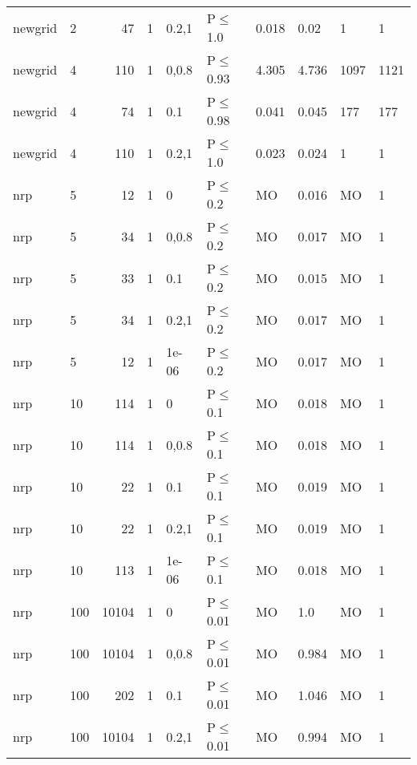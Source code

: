 \begin{longtable}{llrrllllll}
 newgrid       & 2        &     	47 & 1 & 0.2,1 & P$\leq$1.0   & 0.018   & 0.02     & 1      & 1      \\
 newgrid       & 4        &    	110 & 1 & 0,0.8 & P$\leq$0.93  & 4.305   & 4.736    & 1097   & 1121   \\
 newgrid       & 4        &     	74 & 1 & 0.1   & P$\leq$0.98  & 0.041   & 0.045    & 177    & 177    \\
 newgrid       & 4        &    	110 & 1 & 0.2,1 & P$\leq$1.0   & 0.023   & 0.024    & 1      & 1      \\
 nrp           & 5        &     	12 & 1 & 0     & P$\leq$0.2   & MO      & 0.016    & MO     & 1      \\
 nrp           & 5        &     	34 & 1 & 0,0.8 & P$\leq$0.2   & MO      & 0.017    & MO     & 1      \\
 nrp           & 5        &     	33 & 1 & 0.1   & P$\leq$0.2   & MO      & 0.015    & MO     & 1      \\
 nrp           & 5        &     	34 & 1 & 0.2,1 & P$\leq$0.2   & MO      & 0.017    & MO     & 1      \\
 nrp           & 5        &     	12 & 1 & 1e-06 & P$\leq$0.2   & MO      & 0.017    & MO     & 1      \\
 nrp           & 10       &    	114 & 1 & 0     & P$\leq$0.1   & MO      & 0.018    & MO     & 1      \\
 nrp           & 10       &    	114 & 1 & 0,0.8 & P$\leq$0.1   & MO      & 0.018    & MO     & 1      \\
 nrp           & 10       &     	22 & 1 & 0.1   & P$\leq$0.1   & MO      & 0.019    & MO     & 1      \\
 nrp           & 10       &     	22 & 1 & 0.2,1 & P$\leq$0.1   & MO      & 0.019    & MO     & 1      \\
 nrp           & 10       &    	113 & 1 & 1e-06 & P$\leq$0.1   & MO      & 0.018    & MO     & 1      \\
 nrp           & 100      &  	10104 & 1 & 0     & P$\leq$0.01  & MO      & 1.0      & MO     & 1      \\
 nrp           & 100      &  	10104 & 1 & 0,0.8 & P$\leq$0.01  & MO      & 0.984    & MO     & 1      \\
 nrp           & 100      &    	202 & 1 & 0.1   & P$\leq$0.01  & MO      & 1.046    & MO     & 1      \\
 nrp           & 100      &  	10104 & 1 & 0.2,1 & P$\leq$0.01  & MO      & 0.994    & MO     & 1      \\

\end{longtable}
